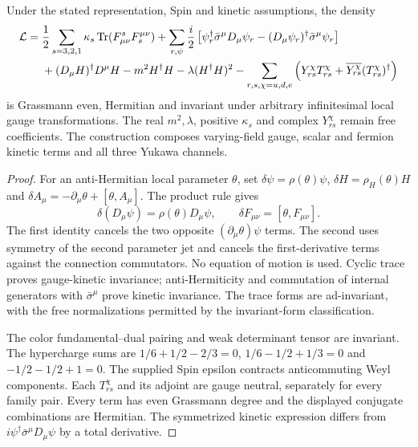 \begin{theorem}
\label{thm:local-sm-jet-action}
Under the stated representation, Spin and kinetic assumptions, the density
\begin{align}
 \mathcal L={}&\frac12\sum_{s=3,2,1}\kappa_s
             \operatorname{Tr}(F^s_{\mu\nu}F_s^{\mu\nu})
       +\sum_{r,\psi}\frac{i}{2}
          \left[\psi_r^\dagger\bar\sigma^\mu D_\mu\psi_r
             -(D_\mu\psi_r)^\dagger\bar\sigma^\mu\psi_r\right]\notag\\
 &+(D_\mu H)^\dagger D^\mu H-m^2H^\dagger H
          -\lambda(H^\dagger H)^2
       -\sum_{r,s,\chi=u,d,e}\left(Y^\chi_{rs}T^\chi_{rs}
                    +\overline{Y^\chi_{rs}}(T^\chi_{rs})^\dagger\right)
 \label{eq:local-sm-assembled-density}
\end{align}
is Grassmann even, Hermitian and invariant under arbitrary infinitesimal
local gauge transformations. The real $m^2,\lambda$, positive $\kappa_s$
and complex $Y^\chi_{rs}$ remain free coefficients. The construction
composes varying-field gauge, scalar and fermion kinetic terms and all
three Yukawa channels.
\end{theorem}
\begin{proof}
For an anti-Hermitian local parameter $\theta$, set
$\delta\psi=\rho(\theta)\psi$, $\delta H=\rho_H(\theta)H$ and
$\delta A_\mu=-\partial_\mu\theta+[\theta,A_\mu]$.
The product rule gives
\[
 \delta(D_\mu\psi)=\rho(\theta)D_\mu\psi,\qquad
 \delta F_{\mu\nu}=[\theta,F_{\mu\nu}].
\]
The first identity cancels the two opposite
$(\partial_\mu\theta)\psi$ terms. The second uses symmetry of the second
parameter jet and cancels the first-derivative terms against the
connection commutators. No equation of motion is used. Cyclic trace
proves gauge-kinetic invariance; anti-Hermiticity and commutation of
internal generators with $\bar\sigma^\mu$ prove kinetic invariance. The
trace forms are ad-invariant, with the free normalizations permitted by
the invariant-form classification.

The color fundamental--dual pairing and weak determinant tensor are
invariant. The hypercharge sums are
$1/6+1/2-2/3=0$, $1/6-1/2+1/3=0$ and $-1/2-1/2+1=0$.
The supplied Spin epsilon contracts anticommuting Weyl components.
Each $T^\chi_{rs}$ and its adjoint are gauge neutral, separately for every
family pair. Every term has even Grassmann degree and the displayed
conjugate combinations are Hermitian. The symmetrized kinetic expression
differs from $i\psi^\dagger\bar\sigma^\mu D_\mu\psi$ by a total derivative.
\end{proof}

